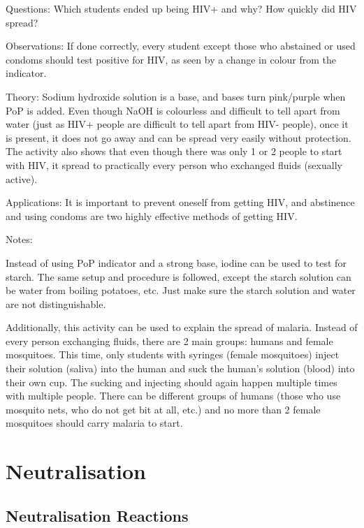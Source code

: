 \begin{multicols}{2}
\begin{description*}
\item[Questions:]{Which students ended up being HIV+ and why? How quickly did HIV spread?}
\item[Observations:]{If done correctly, every student except those who abstained or used condoms should test positive for HIV, as seen by a change in colour from the indicator.}
\item[Theory:]{Sodium hydroxide solution is a base, and bases turn pink/purple when PoP is added. Even though NaOH is colourless and difficult to tell apart from water (just as HIV+ people are difficult to tell apart from HIV- people), once it is present, it does not go away and can be spread very easily without protection. The activity also shows that even though there was only 1 or 2 people to start with HIV, it spread to practically every person who exchanged fluids (sexually active).}
\item[Applications:]{It is important to prevent oneself from getting HIV, and abstinence and using condoms are two highly effective methods of getting HIV.}
\item[Notes:]{Instead of using PoP indicator and a strong base, iodine can be used to test for starch. The same setup and procedure is followed, except the starch solution can be water from boiling potatoes, etc. Just make sure the starch solution and water are not distinguishable. 

Additionally, this activity can be used to explain the spread of malaria. Instead of every person exchanging fluids, there are 2 main groups: humans and female mosquitoes. This time, only students with syringes (female mosquitoes) inject their solution (saliva) into the human and suck the human's solution (blood) into their own cup. The sucking and injecting should again happen multiple times with multiple people. There can be different groups of humans (those who use mosquito nets, who do not get bit at all, etc.) and no more than 2 female mosquitoes should carry malaria to start.}
\end{description*}

\vfill
\columnbreak


\section*{Neutralisation}


\subsection{Neutralisation Reactions}


\end{multicols}
